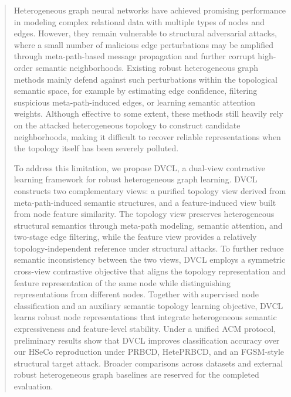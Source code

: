 ﻿\begin{abstract}
Heterogeneous graph neural networks have achieved promising performance in modeling complex relational data with multiple types of nodes and edges.
However, they remain vulnerable to structural adversarial attacks, where a small number of malicious edge perturbations may be amplified through meta-path-based message propagation and further corrupt high-order semantic neighborhoods.
Existing robust heterogeneous graph methods mainly defend against such perturbations within the topological semantic space, for example by estimating edge confidence, filtering suspicious meta-path-induced edges, or learning semantic attention weights.
Although effective to some extent, these methods still heavily rely on the attacked heterogeneous topology to construct candidate neighborhoods, making it difficult to recover reliable representations when the topology itself has been severely polluted.

To address this limitation, we propose DVCL, a dual-view contrastive learning framework for robust heterogeneous graph learning.
DVCL constructs two complementary views: a purified topology view derived from meta-path-induced semantic structures, and a feature-induced view built from node feature similarity.
The topology view preserves heterogeneous structural semantics through meta-path modeling, semantic attention, and two-stage edge filtering, while the feature view provides a relatively topology-independent reference under structural attacks.
To further reduce semantic inconsistency between the two views, DVCL employs a symmetric cross-view contrastive objective that aligns the topology representation and feature representation of the same node while distinguishing representations from different nodes.
Together with supervised node classification and an auxiliary semantic topology learning objective, DVCL learns robust node representations that integrate heterogeneous semantic expressiveness and feature-level stability.
Under a unified ACM protocol, preliminary results show that DVCL improves classification accuracy over our HSeCo reproduction under PRBCD, HetePRBCD, and an FGSM-style structural target attack. Broader comparisons across datasets and external robust heterogeneous graph baselines are reserved for the completed evaluation.
\end{abstract}

